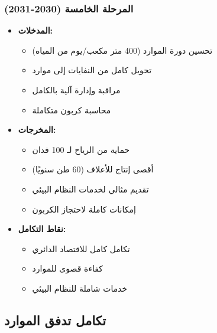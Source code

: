 \subsubsection{المرحلة الخامسة (2030-2031)}
\begin{itemize}
    \item \textbf{المدخلات:}
    \begin{itemize}
        \item تحسين دورة الموارد (400 متر مكعب/يوم من المياه)
        \item تحويل كامل من النفايات إلى موارد
        \item مراقبة وإدارة آلية بالكامل
        \item محاسبة كربون متكاملة
    \end{itemize}
    \item \textbf{المخرجات:}
    \begin{itemize}
        \item حماية من الرياح لـ 100 فدان
        \item أقصى إنتاج للأعلاف (60 طن سنويًا)
        \item تقديم مثالي لخدمات النظام البيئي
        \item إمكانات كاملة لاحتجاز الكربون
    \end{itemize}
    \item \textbf{نقاط التكامل:}
    \begin{itemize}
        \item تكامل كامل للاقتصاد الدائري
        \item كفاءة قصوى للموارد
        \item خدمات شاملة للنظام البيئي
    \end{itemize}
\end{itemize}

\subsection{تكامل تدفق الموارد}

